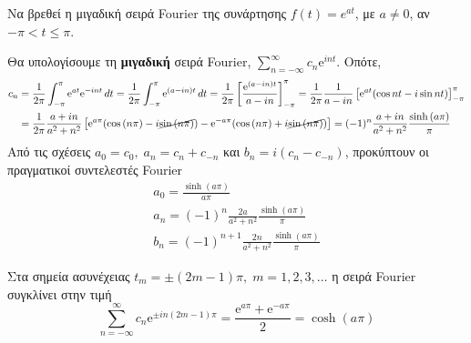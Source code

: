 \begin{mybox3}
  \begin{example}
    Να βρεθεί η μιγαδική σειρά Fourier της συνάρτησης 
    $ f(t) = e^{at} $, με $ a \neq 0 $, αν $ - \pi < t \leq \pi $.
  \end{example}
\end{mybox3}
\begin{solution}
  Θα υπολογίσουμε τη \textbf{μιγαδική} σειρά Fourier,  
  $ \sum\limits_{n=- \infty}^{\infty} c_{n} \mathrm{e}^{int} $. Οπότε, 
  \begin{align*}
    c_{n} &= \frac{1}{2 \pi} \int _{- \pi }^{\pi} \mathrm{e}^{at} \mathrm{e}^{-int } 
    \,{dt} = \frac{1}{2 \pi} \int _{- \pi }^{\pi} \mathrm{e}^{(a-in)t} \,{dt} = 
    \frac{1}{2 \pi} \left[\frac{\mathrm{e}^{(a-in)t}}{a- in} \right]_{- \pi }^{\pi} = 
    \frac{1}{2 \pi} \frac{1}{a-in} \left[\mathrm{e}^{at} (\cos{nt} - i 
    \sin{nt})\right]_{- \pi }^{\pi} \\
          &= \frac{1}{2 \pi} \frac{a+in}{a^{2}+n^{2}} 
          \left[\mathrm{e}^{a \pi} (\cos{(n \pi)- i \cancel{\sin{(n \pi)}}) - 
            \mathrm{e}^{-a \pi } (\cos{(n \pi )}}
          +i \cancel{\sin{(n \pi)}} )\right] = (-1)^{n} \frac{a+in}{a^{2}+n^{2}} 
          \frac{\sinh{(a \pi)}}{\pi}
  \end{align*}
  Από τις σχέσεις $ a_{0}= c_{0}, \; a_{n}= c_{n}+c_{-n} $ και 
  $ b_{n}=i(c_{n}-c_{-n}) $, προκύπτουν οι πραγματικοί συντελεστές Fourier
  \begin{gather*}
    a_{0}= \frac{\sinh{(a \pi)}}{a\pi}  \\
    a_{n}= (-1)^{n} \frac{2a}{a^{2}+n^{2}} \frac{\sinh{(a \pi)}}{\pi} \\
    b_{n} = (-1)^{n+1} \frac{2n}{a^{2}+n^{2}} \frac{\sinh{(a \pi)}}{\pi} 
  \end{gather*} 
\end{solution}
Στα σημεία ασυνέχειας $ t_{m} = \pm (2m-1) \pi, \; m=1,2,3,\ldots $ η σειρά Fourier 
συγκλίνει στην τιμή 
\[
  \sum_{n=- \infty}^{\infty} c_{n} \mathrm{e}^{\pm in (2m-1) \pi} = 
  \frac{\mathrm{e}^{a \pi} + \mathrm{e}^{- a \pi}}{2} = \cosh{(a \pi)}  
\] 

